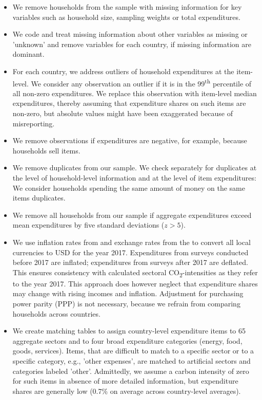 \documentclass[12pt, a4paper]{article}
\begin{document}
\begin{refsection}
\begin{itemize}
    \item We remove households from the sample with missing information for key variables such as household size, sampling weights or total expenditures.
    \item We code and treat missing information about other variables as missing or 'unknown' and remove variables for each country, if missing information are dominant.
    \item For each country, we address outliers of household expenditures at the item-level. We consider any observation an outlier if it is in the 99\textsuperscript{th} percentile of all non-zero expenditures. We replace this observation with item-level median expenditures, thereby assuming that expenditure shares on such items are non-zero, but absolute values might have been exaggerated because of misreporting.
    \item We remove observations if expenditures are negative, for example, because households sell items.
    \item We remove duplicates from our sample. We check separately for duplicates at the level of household-level information and at the level of item expenditures: We consider households spending the same amount of money on the same items duplicates.
    \item We remove all households from our sample if aggregate expenditures exceed mean expenditures by five standard deviations ($z>5$).
    \item We use inflation rates from \textcite{IMF.2020} and exchange rates from the \textcite{WorldBankGroup.2023} to convert all local currencies to USD for the year 2017. Expenditures from surveys conducted before 2017 are inflated; expenditures from surveys after 2017 are deflated. This ensures consistency with calculated sectoral CO\textsubscript{2}-intensities as they refer to the year 2017. This approach does however neglect that expenditure shares may change with rising incomes and inflation. Adjustment for purchasing power parity (PPP) is not necessary, because we refrain from comparing households across countries.
    \item We create matching tables to assign country-level expenditure items to 65 aggregate sectors and to four broad expenditure categories (energy, food, goods, services). Items, that are difficult to match to a specific sector or to a specific category, e.g., 'other expenses', are matched to artificial sectors and categories labeled 'other'. Admittedly, we assume a carbon intensity of zero for such items in absence of more detailed information, but expenditure shares are generally low (0.7\% on average across country-level averages). 

\end{itemize}
\end{refsection}
\end{document}
